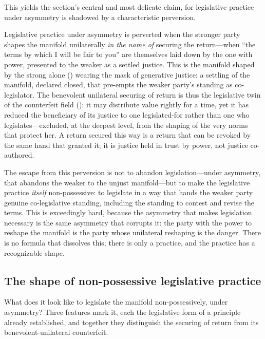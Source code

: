 This yields the section's central and most delicate claim, for legislative practice under asymmetry is shadowed by a characteristic perversion.

\begin{claim}
Legislative practice under asymmetry is perverted when the stronger party shapes the manifold unilaterally \emph{in the name of} securing the return---when ``the terms by which I will be fair to you'' are themselves laid down by the one with power, presented to the weaker as a settled justice. This is the manifold shaped by the strong alone () wearing the mask of generative justice: a settling of the manifold, declared closed, that pre-empts the weaker party's standing as co-legislator. The benevolent unilateral securing of return is thus the legislative twin of the counterfeit field (): it may distribute value rightly for a time, yet it has reduced the beneficiary of its justice to one legislated-for rather than one who legislates---excluded, at the deepest level, from the shaping of the very norms that protect her. A return secured this way is a return that can be revoked by the same hand that granted it; it is justice held in trust by power, not justice co-authored.
\end{claim}

The escape from this perversion is not to abandon legislation---under asymmetry, that abandons the weaker to the unjust manifold---but to make the legislative practice \emph{itself} non-possessive: to legislate in a way that hands the weaker party genuine co-legislative standing, including the standing to contest and revise the terms. This is exceedingly hard, because the asymmetry that makes legislation necessary is the same asymmetry that corrupts it: the party with the power to reshape the manifold is the party whose unilateral reshaping is the danger. There is no formula that dissolves this; there is only a practice, and the practice has a recognizable shape.

\subsection{The shape of non-possessive legislative practice}
\label{p09:sec:nonposs-legislation}

What does it look like to legislate the manifold non-possessively, under asymmetry? Three features mark it, each the legislative form of a principle already established, and together they distinguish the securing of return from its benevolent-unilateral counterfeit.

